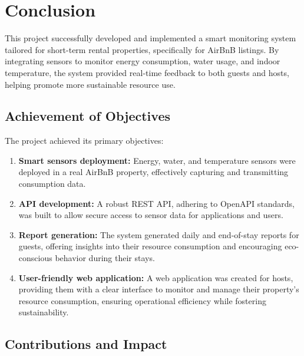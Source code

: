 

\chapter{Conclusion}


This project successfully developed and implemented a smart monitoring system tailored for short-term rental properties, 
specifically for AirBnB listings. By integrating sensors to monitor energy consumption, water usage, and indoor 
temperature, the system provided real-time feedback to both guests and hosts, helping promote more sustainable resource 
use.

\section{Achievement of Objectives}

The project achieved its primary objectives:

\begin{enumerate}
  \item \textbf{Smart sensors deployment:} Energy, water, and temperature sensors were deployed in a real AirBnB 
  property, effectively capturing and transmitting consumption data.
  \item \textbf{API development:} A robust REST API, adhering to OpenAPI standards, was built to allow secure access to 
  sensor data for applications and users.
  \item \textbf{Report generation:} The system generated daily and end-of-stay reports for guests, offering insights 
  into their resource consumption and encouraging eco-conscious behavior during their stays.
  \item \textbf{User-friendly web application:} A web application was created for hosts, providing them with a clear 
  interface to monitor and manage their property's resource consumption, ensuring operational efficiency while fostering 
  sustainability.
\end{enumerate}

\section{Contributions and Impact}

